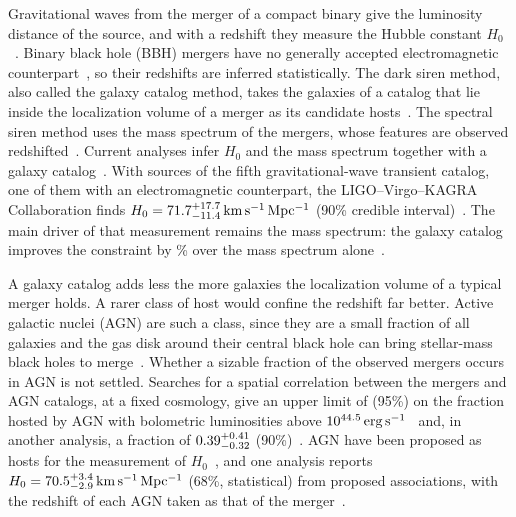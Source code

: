 \documentclass[aps,prd,reprint,amsmath,amssymb,nofootinbib]{revtex4-2}
\newcommand{\kmsMpc}{\,{\rm km\,s^{-1}\,Mpc^{-1}}}
\begin{document}
Gravitational waves from the merger of a compact binary give the luminosity distance of the source, and with a redshift they measure the Hubble constant $H_0$~\cite{Schutz:1986gp,Holz:2005df}.
Binary black hole (BBH) mergers have no generally accepted electromagnetic counterpart~\cite{Graham:2020gwr,Graham:2022xxu,Palmese:2021wcv,Veronesi:2024pjq,Cabrera:2025tzc}, so their redshifts are inferred statistically.
The dark siren method, also called the galaxy catalog method, takes the galaxies of a catalog that lie inside the localization volume of a merger as its candidate hosts~\cite{Schutz:1986gp,DelPozzo:2011vcw,LIGOScientific:2018gmd,DES:2019ccw,Gray:2019ksv,DES:2020nay,Finke:2021aom,Palmese:2021mjm}.
The spectral siren method uses the mass spectrum of the mergers, whose features are observed redshifted~\cite{Taylor:2011fs,Farr:2019twy,Mastrogiovanni:2021wsd,Ezquiaga:2022zkx}.
Current analyses infer $H_0$ and the mass spectrum together with a galaxy catalog~\cite{Mastrogiovanni:2023emh,Gray:2023wgj,Borghi:2023opd}.
With \IndLitFifthNsrc{} sources of the fifth gravitational-wave transient catalog, one of them with an electromagnetic counterpart, the LIGO--Virgo--KAGRA Collaboration finds $H_0=\IndLitFifthHzero\kmsMpc$ (90\% credible interval)~\cite{LIGOScientific:2026uyd}.
The main driver of that measurement remains the mass spectrum: the galaxy catalog improves the constraint by \IndLitFifthCatGain\% over the mass spectrum alone~\cite{LIGOScientific:2026uyd}.

A galaxy catalog adds less the more galaxies the localization volume of a typical merger holds.
A rarer class of host would confine the redshift far better.
Active galactic nuclei (AGN) are such a class, since they are a small fraction of all galaxies and the gas disk around their central black hole can bring stellar-mass black holes to merge~\cite{Bartos:2016dgn,Stone:2016wzz,Mckernan:2017ssq,Tagawa:2019osr}.
Whether a sizable fraction of the observed mergers occurs in AGN is not settled.
Searches for a spatial correlation between the mergers and AGN catalogs, at a fixed cosmology, give an upper limit of \IndLitQuaiafAGNUL{} (95\%) on the fraction hosted by AGN with bolometric luminosities above $10^{44.5}\,{\rm erg\,s^{-1}}$~\cite{Veronesi:2024tef} and, in another analysis, a fraction of $0.39^{+0.41}_{-0.32}$ (90\%)~\cite{Zhu:2025rdv}.
AGN have been proposed as hosts for the measurement of $H_0$~\cite{Alves:2020wnl,Bom:2023zgw,Li:2025eig}, and one analysis reports $H_0=\IndLitKumarHzero\kmsMpc$ (68\%, statistical) from \IndLitKumarN{} proposed associations, with the redshift of each AGN taken as that of the merger~\cite{Kumar:2026bqt}.
\end{document}
